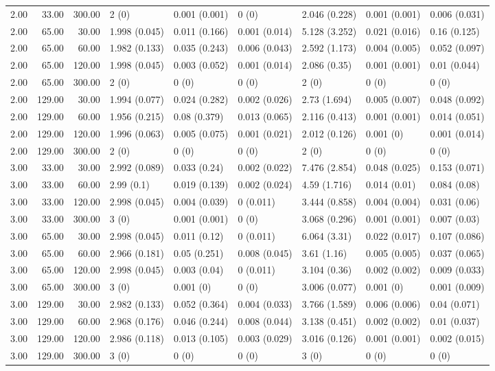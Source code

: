 \begin{table}[ht]
\begin{tabular}{rrrllllll}
  2.00 & 33.00 & 300.00 & 2 (0) & 0.001 (0.001) & 0 (0) & 2.046 (0.228) & 0.001 (0.001) & 0.006 (0.031) \\ 
  2.00 & 65.00 & 30.00 & 1.998 (0.045) & 0.011 (0.166) & 0.001 (0.014) & 5.128 (3.252) & 0.021 (0.016) & 0.16 (0.125) \\ 
  2.00 & 65.00 & 60.00 & 1.982 (0.133) & 0.035 (0.243) & 0.006 (0.043) & 2.592 (1.173) & 0.004 (0.005) & 0.052 (0.097) \\ 
  2.00 & 65.00 & 120.00 & 1.998 (0.045) & 0.003 (0.052) & 0.001 (0.014) & 2.086 (0.35) & 0.001 (0.001) & 0.01 (0.044) \\ 
  2.00 & 65.00 & 300.00 & 2 (0) & 0 (0) & 0 (0) & 2 (0) & 0 (0) & 0 (0) \\ 
  2.00 & 129.00 & 30.00 & 1.994 (0.077) & 0.024 (0.282) & 0.002 (0.026) & 2.73 (1.694) & 0.005 (0.007) & 0.048 (0.092) \\ 
  2.00 & 129.00 & 60.00 & 1.956 (0.215) & 0.08 (0.379) & 0.013 (0.065) & 2.116 (0.413) & 0.001 (0.001) & 0.014 (0.051) \\ 
  2.00 & 129.00 & 120.00 & 1.996 (0.063) & 0.005 (0.075) & 0.001 (0.021) & 2.012 (0.126) & 0.001 (0) & 0.001 (0.014) \\ 
  2.00 & 129.00 & 300.00 & 2 (0) & 0 (0) & 0 (0) & 2 (0) & 0 (0) & 0 (0) \\ 
  3.00 & 33.00 & 30.00 & 2.992 (0.089) & 0.033 (0.24) & 0.002 (0.022) & 7.476 (2.854) & 0.048 (0.025) & 0.153 (0.071) \\ 
  3.00 & 33.00 & 60.00 & 2.99 (0.1) & 0.019 (0.139) & 0.002 (0.024) & 4.59 (1.716) & 0.014 (0.01) & 0.084 (0.08) \\ 
  3.00 & 33.00 & 120.00 & 2.998 (0.045) & 0.004 (0.039) & 0 (0.011) & 3.444 (0.858) & 0.004 (0.004) & 0.031 (0.06) \\ 
  3.00 & 33.00 & 300.00 & 3 (0) & 0.001 (0.001) & 0 (0) & 3.068 (0.296) & 0.001 (0.001) & 0.007 (0.03) \\ 
  3.00 & 65.00 & 30.00 & 2.998 (0.045) & 0.011 (0.12) & 0 (0.011) & 6.064 (3.31) & 0.022 (0.017) & 0.107 (0.086) \\ 
  3.00 & 65.00 & 60.00 & 2.966 (0.181) & 0.05 (0.251) & 0.008 (0.045) & 3.61 (1.16) & 0.005 (0.005) & 0.037 (0.065) \\ 
  3.00 & 65.00 & 120.00 & 2.998 (0.045) & 0.003 (0.04) & 0 (0.011) & 3.104 (0.36) & 0.002 (0.002) & 0.009 (0.033) \\ 
  3.00 & 65.00 & 300.00 & 3 (0) & 0.001 (0) & 0 (0) & 3.006 (0.077) & 0.001 (0) & 0.001 (0.009) \\ 
  3.00 & 129.00 & 30.00 & 2.982 (0.133) & 0.052 (0.364) & 0.004 (0.033) & 3.766 (1.589) & 0.006 (0.006) & 0.04 (0.071) \\ 
  3.00 & 129.00 & 60.00 & 2.968 (0.176) & 0.046 (0.244) & 0.008 (0.044) & 3.138 (0.451) & 0.002 (0.002) & 0.01 (0.037) \\ 
  3.00 & 129.00 & 120.00 & 2.986 (0.118) & 0.013 (0.105) & 0.003 (0.029) & 3.016 (0.126) & 0.001 (0.001) & 0.002 (0.015) \\ 
  3.00 & 129.00 & 300.00 & 3 (0) & 0 (0) & 0 (0) & 3 (0) & 0 (0) & 0 (0) \\ 
   \hline
\end{tabular}
\end{table}
